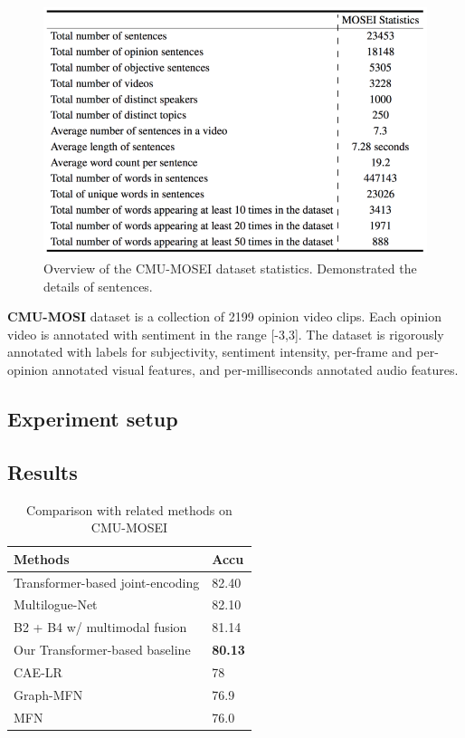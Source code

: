 \documentclass[11pt]{article}
\begin{document}
\begin{figure}[t] %
    \centering
    \includegraphics[width=\columnwidth]{img/mosei.png}
    \caption{Overview of the CMU-MOSEI dataset statistics. Demonstrated the details of sentences.}
    \label{fig:SSN}
\end{figure}

\textbf{CMU-MOSI} dataset is a collection of 2199 opinion video clips. Each opinion video is annotated with sentiment in the range [-3,3]. The dataset is rigorously annotated with labels for subjectivity, sentiment intensity, per-frame and per-opinion annotated visual features, and per-milliseconds annotated audio features.

\subsection{Experiment setup}

\subsection{Results}

\begin{table}[t]
\centering
\begin{tabular}{ll}
\hline
\textbf{Methods}       & \textbf{Accu}      \\ 
\hline
Transformer-based joint-encoding & 82.40      \\ 
Multilogue-Net & 82.10     \\ 
B2 + B4 w/ multimodal fusion & 81.14     \\ 
Our Transformer-based baseline  & \textbf{80.13} \\ 
CAE-LR & 78 \\
Graph-MFN & 76.9 \\
MFN & 76.0 \\ \hline
\end{tabular}
\caption{\label{result}Comparison with related methods on CMU-MOSEI}
\end{table}
\end{document}
